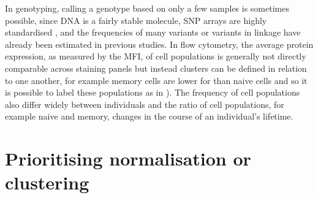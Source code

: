 In genotyping, calling a genotype based on only a few samples is sometimes possible, since DNA is a fairly stable molecule, SNP arrays are highly standardised \citep{Di:2005uj,Giannoulatou:2008ty}, and the frequencies of many variants or variants in linkage have already been estimated in previous studies.
In flow cytometry, the average protein expression, as measured by the \gls{MFI}, of cell populations is generally not directly comparable across staining panels but instead clusters can be defined in relation to one another, for example memory cells are lower for  than naive cells and so it is possible to label these populations as in ).
The frequency of cell populations also differ widely between individuals and the ratio of cell populations, for example naive and memory, changes in the course of an individual's lifetime.

\section{Prioritising normalisation or clustering}


